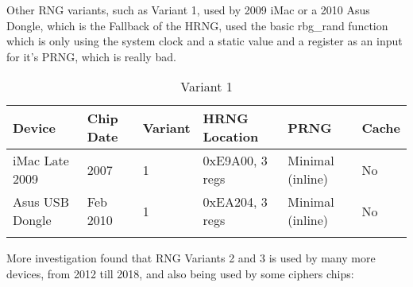     Other RNG variants, such as Variant 1, used by 2009 iMac or a 2010 Asus Dongle, which is the Fallback of the HRNG, used the basic rbg\_rand function which is only using the system clock and a static value and a register as an input for it’s PRNG, which is really bad.
    
    \begin{table}[htb]
                \caption{Variant 1}	
                \begin{adjustbox}{width=\textwidth}

        \begin{tabular}{llllll}
            \hline
            \multicolumn{1}{|l|}{\textbf{Device}}   & \multicolumn{1}{l|}{\textbf{Chip Date}} & \multicolumn{1}{l|}{\textbf{Variant}} & \multicolumn{1}{l|}{\textbf{HRNG Location}} & \multicolumn{1}{l|}{\textbf{PRNG}}      & \multicolumn{1}{l|}{\textbf{Cache}} \\ \hline
            \multicolumn{1}{|l|}{iMac Late   2009}  & \multicolumn{1}{l|}{2007}               & \multicolumn{1}{l|}{1}                & \multicolumn{1}{l|}{0xE9A00, 3   regs}      & \multicolumn{1}{l|}{Minimal   (inline)} & \multicolumn{1}{l|}{No}             \\ \hline
            \multicolumn{1}{|l|}{Asus USB   Dongle} & \multicolumn{1}{l|}{Feb 2010}           & \multicolumn{1}{l|}{1}                & \multicolumn{1}{l|}{0xEA204, 3   regs}      & \multicolumn{1}{l|}{Minimal   (inline)} & \multicolumn{1}{l|}{No}             \\ \hline
            &                                         &                                       &                                             &                                         &                                    
        \end{tabular}
    \end{adjustbox}

    \end{table}
    
    More investigation found that RNG Variants 2 and 3 is used by many more devices, from 2012 till 2018, and also being used by some ciphers chips:
    
